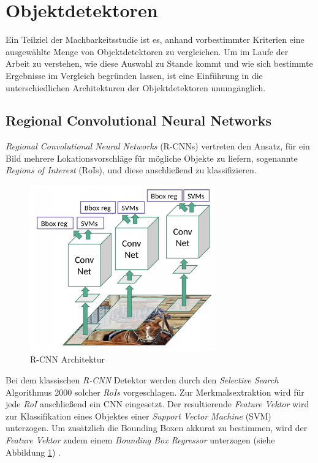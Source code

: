 \section{Objektdetektoren} \label{detection}

Ein Teilziel der Machbarkeitsstudie ist es, anhand vorbestimmter Kriterien eine ausgewählte Menge von Objektdetektoren zu vergleichen. Um im Laufe der Arbeit zu verstehen, wie diese Auswahl zu Stande kommt und wie sich bestimmte Ergebnisse im Vergleich begründen lassen, ist eine Einführung in die unterschiedlichen Architekturen der Objektdetektoren unumgänglich. 

\subsection*{Regional Convolutional Neural Networks}

\textit{Regional Convolutional Neural Networks} (R-CNNs) vertreten den Ansatz, für ein Bild mehrere Lokationsvorschläge für mögliche Objekte zu liefern, sogenannte \textit{Regions of Interest} (RoIs), und diese anschließend zu klassifizieren. 

\begin{figure}[H]
	\begin{center}
		\includegraphics[width=8cm]{Bilder/rcnn.png} 
		\caption[R-CNN Architektur]{R-CNN Architektur \cite{RohithGandhi.20180709}}
		\label{rcnn}
	\end{center}
\end{figure}

Bei dem klassischen \textit{R-CNN} Detektor werden durch den \textit{Selective Search} Algorithmus 2000 solcher \textit{RoIs} vorgeschlagen. Zur Merkmalsextraktion wird für jede \textit{RoI} anschließend ein CNN eingesetzt. Der resultierende \textit{Feature Vektor} wird zur Klassifikation eines Objektes einer \textit{Support Vector Machine} (SVM) unterzogen. Um zusätzlich die Bounding Boxen akkurat zu bestimmen, wird der \textit{Feature Vektor} zudem einem \textit{Bounding Box Regressor} unterzogen (siehe Abbildung \ref{rcnn}) \cite{RossGirshickJeffDonahueTrevorDarrellJitendraMalik.2016}. 

